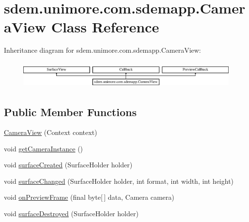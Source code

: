 \hypertarget{classsdem_1_1unimore_1_1com_1_1sdemapp_1_1_camera_view}{\section{sdem.\+unimore.\+com.\+sdemapp.\+Camera\+View Class Reference}
\label{classsdem_1_1unimore_1_1com_1_1sdemapp_1_1_camera_view}
}
Inheritance diagram for sdem.\+unimore.\+com.\+sdemapp.\+Camera\+View\+:\begin{figure}[H]
\begin{center}
\leavevmode
\includegraphics[height=1.464052cm]{classsdem_1_1unimore_1_1com_1_1sdemapp_1_1_camera_view}
\end{center}
\end{figure}
\subsection*{Public Member Functions}
\begin{DoxyCompactItemize}
\item 
\hyperlink{classsdem_1_1unimore_1_1com_1_1sdemapp_1_1_camera_view_af5ea121550990df11719c2af26240ac2}{Camera\+View} (Context context)
\item 
void \hyperlink{classsdem_1_1unimore_1_1com_1_1sdemapp_1_1_camera_view_a67b6b078d0431699ce46317d9286158f}{get\+Camera\+Instance} ()
\item 
void \hyperlink{classsdem_1_1unimore_1_1com_1_1sdemapp_1_1_camera_view_ace511ad999943fe26880cad904a9ceec}{surface\+Created} (Surface\+Holder holder)
\item 
void \hyperlink{classsdem_1_1unimore_1_1com_1_1sdemapp_1_1_camera_view_a9e58ea3f8f605797b28cd41c9fd4c973}{surface\+Changed} (Surface\+Holder holder, int format, int width, int height)
\item 
void \hyperlink{classsdem_1_1unimore_1_1com_1_1sdemapp_1_1_camera_view_a25879df1d6c2e44dbfb06c3545f01520}{on\+Preview\+Frame} (final byte\mbox{[}$\,$\mbox{]} data, Camera camera)
\item 
void \hyperlink{classsdem_1_1unimore_1_1com_1_1sdemapp_1_1_camera_view_a9a27054b8ad448e20eabb5b468e8257d}{surface\+Destroyed} (Surface\+Holder holder)
\end{DoxyCompactItemize}


